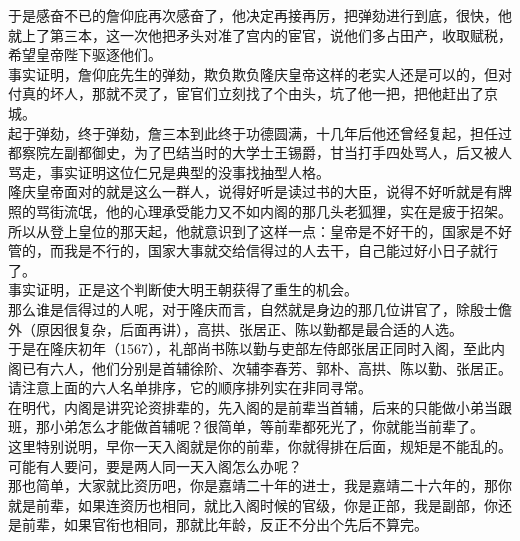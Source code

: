 \begin{multicols}{\theparacolNo}
于是感奋不已的詹仰庇再次感奋了，他决定再接再厉，把弹劾进行到底，很快，他就上了第三本，这一次他把矛头对准了宫内的宦官，说他们多占田产，收取赋税，希望皇帝陛下驱逐他们。\\

事实证明，詹仰庇先生的弹劾，欺负欺负隆庆皇帝这样的老实人还是可以的，但对付真的坏人，那就不灵了，宦官们立刻找了个由头，坑了他一把，把他赶出了京城。\\

起于弹劾，终于弹劾，詹三本到此终于功德圆满，十几年后他还曾经复起，担任过都察院左副都御史，为了巴结当时的大学士王锡爵，甘当打手四处骂人，后又被人骂走，事实证明这位仁兄是典型的没事找抽型人格。\\

隆庆皇帝面对的就是这么一群人，说得好听是读过书的大臣，说得不好听就是有牌照的骂街流氓，他的心理承受能力又不如内阁的那几头老狐狸，实在是疲于招架。\\

所以从登上皇位的那天起，他就意识到了这样一点：皇帝是不好干的，国家是不好管的，而我是不行的，国家大事就交给信得过的人去干，自己能过好小日子就行了。\\

事实证明，正是这个判断使大明王朝获得了重生的机会。\\

那么谁是信得过的人呢，对于隆庆而言，自然就是身边的那几位讲官了，除殷士儋外（原因很复杂，后面再讲），高拱、张居正、陈以勤都是最合适的人选。\\

于是在隆庆初年（1567），礼部尚书陈以勤与吏部左侍郎张居正同时入阁，至此内阁已有六人，他们分别是首辅徐阶、次辅李春芳、郭朴、高拱、陈以勤、张居正。\\

请注意上面的六人名单排序，它的顺序排列实在非同寻常。\\

在明代，内阁是讲究论资排辈的，先入阁的是前辈当首辅，后来的只能做小弟当跟班，那小弟怎么才能做首辅呢？很简单，等前辈都死光了，你就能当前辈了。\\

这里特别说明，早你一天入阁就是你的前辈，你就得排在后面，规矩是不能乱的。可能有人要问，要是两人同一天入阁怎么办呢？\\

那也简单，大家就比资历吧，你是嘉靖二十年的进士，我是嘉靖二十六年的，那你就是前辈，如果连资历也相同，就比入阁时候的官级，你是正部，我是副部，你还是前辈，如果官衔也相同，那就比年龄，反正不分出个先后不算完。\\


\end{multicols}
